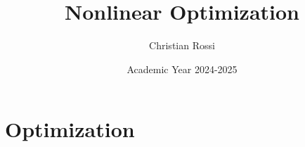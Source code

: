 \documentclass[12pt, a4paper]{report}
\title{\textbf{Nonlinear Optimization}}
\author{Christian Rossi}
\date{Academic Year 2024-2025}
\begin{document}
    \maketitle

    

    \cleardoublepage{}

    \tableofcontents

    \cleardoublepage{}

    \chapter{Optimization}
    
    
\end{document}
